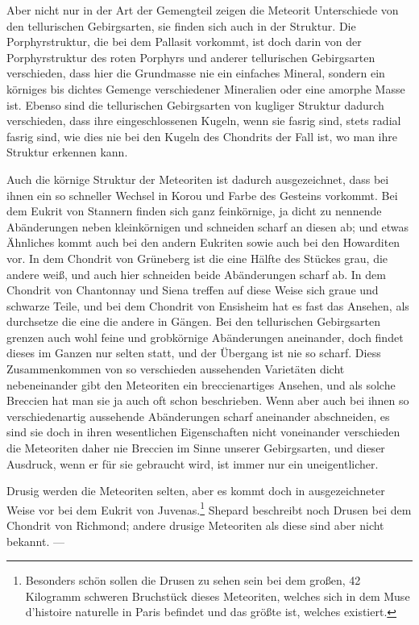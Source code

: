 \documentclass[a4paper, 11pt, oneside]{article}
\begin{document}
Aber nicht nur in der Art der Gemengteil zeigen die Meteorit Unterschiede von den tellurischen Gebirgsarten, sie finden sich auch in der Struktur. Die Porphyrstruktur, die bei dem Pallasit vorkommt, ist doch darin von der Porphyrstruktur des roten Porphyrs und anderer tellurischen Gebirgsarten verschieden, dass hier die Grundmasse nie ein einfaches Mineral, sondern ein körniges bis dichtes Gemenge verschiedener Mineralien oder eine amorphe Masse ist. Ebenso sind die tellurischen Gebirgsarten von kugliger Struktur dadurch verschieden, dass ihre eingeschlossenen Kugeln, wenn sie fasrig sind, stets radial fasrig sind, wie dies nie bei den Kugeln des Chondrits der Fall ist, wo man ihre Struktur erkennen kann.

Auch die körnige Struktur der Meteoriten ist dadurch ausgezeichnet, dass bei ihnen ein so schneller Wechsel in Korou und Farbe des Gesteins vorkommt. Bei dem Eukrit von Stannern finden sich ganz feinkörnige, ja dicht zu nennende Abänderungen neben kleinkörnigen und schneiden scharf an diesen ab; und etwas Ähnliches kommt auch bei den andern Eukriten sowie auch bei den Howarditen vor. In dem Chondrit von Grüneberg ist die eine Hälfte des Stückes grau, die andere weiß, und auch hier schneiden beide Abänderungen scharf ab. In dem Chondrit von Chantonnay und Siena treffen auf diese Weise sich graue und schwarze Teile, und bei dem Chondrit von Ensisheim hat es fast das Ansehen, als durchsetze die eine die andere in Gängen. Bei den tellurischen Gebirgsarten grenzen auch wohl feine und grobkörnige Abänderungen aneinander, doch findet dieses im Ganzen nur selten statt, und der Übergang ist nie so scharf. Diess Zusammenkommen von so verschieden aussehenden Varietäten dicht nebeneinander gibt den Meteoriten ein breccienartiges Ansehen, und als solche Breccien hat man sie ja auch oft schon beschrieben. Wenn aber auch bei ihnen so verschiedenartig aussehende Abänderungen scharf aneinander abschneiden, es sind sie doch in ihren wesentlichen Eigenschaften nicht voneinander verschieden die Meteoriten daher nie Breccien im Sinne unserer Gebirgsarten, und dieser Ausdruck, wenn er für sie gebraucht wird, ist immer nur ein uneigentlicher.

Drusig werden die Meteoriten selten, aber es kommt doch in ausgezeichneter Weise vor bei dem Eukrit von Juvenas.\footnote{Besonders schön sollen die Drusen zu sehen sein bei dem großen, 42 Kilogramm schweren Bruchstück dieses Meteoriten, welches sich in dem Muse d'histoire naturelle in Paris befindet und das größte ist, welches existiert.} Shepard beschreibt noch Drusen bei dem Chondrit von Richmond; andere drusige Meteoriten als diese sind aber nicht bekannt. —
\end{document}
